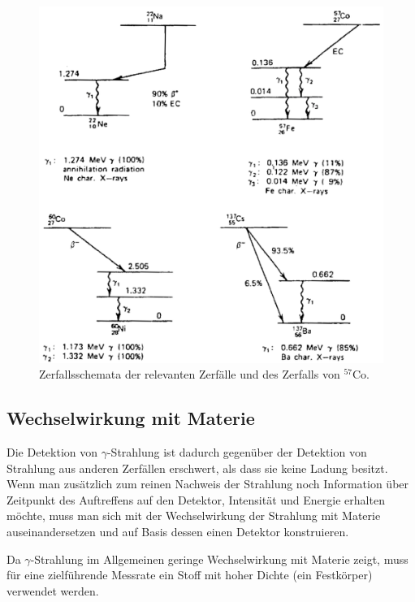 \documentclass[
	a4paper,
	12pt,
	pagesize,
	ngerman
]{scrartcl}
\begin{document}
	\begin{figure}[H]
			\includegraphics[width= 0.8 \linewidth]{charts/Zerfallsschematarot}
			\caption{
				Zerfallsschemata der relevanten Zerfälle und des Zerfalls von $^57$Co.
				\cite{Anleitung}
			}
			\label{fig_zerfallsschemata}
	\end{figure}

	\subsection{Wechselwirkung mit Materie}

	Die Detektion von $\gamma$-Strahlung ist dadurch gegenüber der Detektion von Strahlung aus anderen Zerfällen erschwert, als dass sie keine Ladung besitzt.
	Wenn man zusätzlich zum reinen Nachweis der Strahlung noch Information über Zeitpunkt des Auftreffens auf den Detektor, Intensität und Energie erhalten möchte, muss man sich mit der Wechselwirkung der Strahlung mit Materie auseinandersetzen und auf Basis dessen einen Detektor konstruieren.

	Da $\gamma$-Strahlung im Allgemeinen geringe Wechselwirkung mit Materie zeigt, muss für eine zielführende Messrate ein Stoff mit hoher Dichte (ein Festkörper) verwendet werden.
\end{document}
